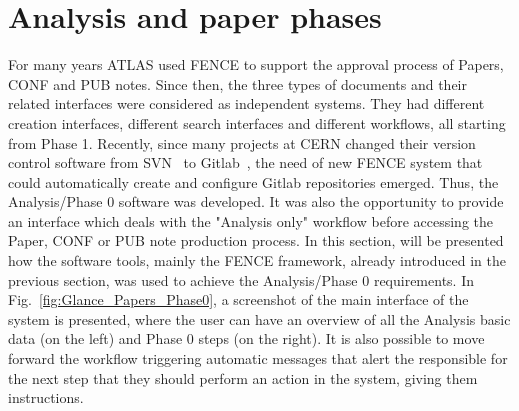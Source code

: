 \section{Analysis and paper phases}
\label{sec:Analysis_and_paper_phases}
For many years ATLAS used FENCE to support the approval process of Papers, CONF and PUB notes. Since then, the three types of documents and their related interfaces were considered as independent systems. They had different creation interfaces, different search interfaces and different workflows, all starting from Phase 1. Recently, since many projects at CERN changed their version control software from SVN~\cite{svn} to Gitlab~\cite{gitlab}, the need of new FENCE system that could automatically create and configure Gitlab repositories emerged. Thus, the Analysis/Phase 0 software was developed. It was also the opportunity to provide an interface which deals with the "Analysis only" workflow before accessing the Paper, CONF or PUB note production process. In this section, will be presented how the software tools, mainly the FENCE framework, already introduced in the previous section, was used to achieve the Analysis/Phase 0 requirements. In Fig.~\ref{fig:Glance_Papers_Phase0}, a screenshot of the main interface of the system is presented, where the user can have an overview of all the Analysis basic data (on the left) and Phase 0 steps (on the right). It is also possible to move forward the workflow triggering automatic messages that alert the responsible for the next step that they should perform an action in the system, giving them instructions.


